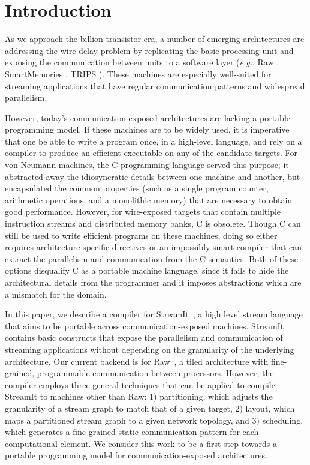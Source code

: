\section{Introduction}

As we approach the billion-transistor era, a number of emerging
architectures are addressing the wire delay problem by replicating the
basic processing unit and exposing the communication between units to
a software layer ({\it e.g.}, Raw \cite{raw}, SmartMemories
\cite{smartmemories}, TRIPS \cite{trips}).  These machines are
especially well-suited for streaming applications that have regular
communication patterns and widespread parallelism.

However, today's communication-exposed architectures are lacking a
portable programming model.  If these machines are to be widely used,
it is imperative that one be able to write a program once, in a
high-level language, and rely on a compiler to produce an efficient
executable on any of the candidate targets. For von-Neumann machines,
the C programming language served this purpose; it abstracted away the
idiosyncratic details between one machine and another, but
encapsulated the common properties (such as a single program counter,
arithmetic operations, and a monolithic memory) that are necessary to
obtain good performance.  However, for wire-exposed targets that
contain multiple instruction streams and distributed memory banks, C
is obsolete.  Though C can still be used to write efficient programs
on these machines, doing so either requires architecture-specific
directives or an impossibly smart compiler that can extract the
parallelism and communication from the C semantics.  Both of these
options disqualify C as a portable machine language, since it fails to
hide the architectural details from the programmer and it imposes
abstractions which are a mismatch for the domain.

In this paper, we describe a compiler for StreamIt~\cite{streamitcc},
a high level stream language that aims to be portable across
communication-exposed machines.  StreamIt contains basic constructs
that expose the parallelism and communication of streaming
applications without depending on the granularity of the underlying
architecture.  Our current backend is for Raw~\cite{raw}, a tiled
architecture with fine-grained, programmable communication between
processors.  However, the compiler employs three general techniques
that can be applied to compile StreamIt to machines other than Raw: 1)
partitioning, which adjusts the granularity of a stream graph to match
that of a given target, 2) layout, which maps a partitioned stream
graph to a given network topology, and 3) scheduling, which generates
a fine-grained static communication pattern for each computational
element.  We consider this work to be a first step towards a portable
programming model for communication-exposed architectures.


